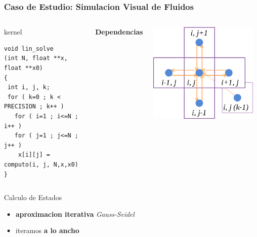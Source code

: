 \documentclass{beamer}\usetheme{Madrid} %
\begin{document}
\begin{frame}[fragile]
\frametitle{Caso de Estudio: Simulacion Visual de Fluidos}
\begin{columns}
\begin{block}{kernel}
\begin{verbatim}
void lin_solve
(int N, float **x, float **x0)
{
 int i, j, k;
 for ( k=0 ; k < PRECISION ; k++ ) 
   for ( i=1 ; i<=N ; i++ ) 
   for ( j=1 ; j<=N ; j++ ) 
    x[i][j] = computo(i, j, N,x,x0)
}
\end{verbatim}
\end{block}
\begin{center}\textbf{Dependencias}\end{center}
\begin{center}
\includegraphics[scale=0.4]{img/deps_kern_2.png}
\end{center}
\end{columns}
\begin{block}{Calculo de Estados}
\begin{itemize}
\item \textbf{aproximacion iterativa} \textit{Gauss-Seidel}
\item iteramos \textbf{a lo ancho}
\end{itemize}
\end{block}
\end{frame}
\end{document}
